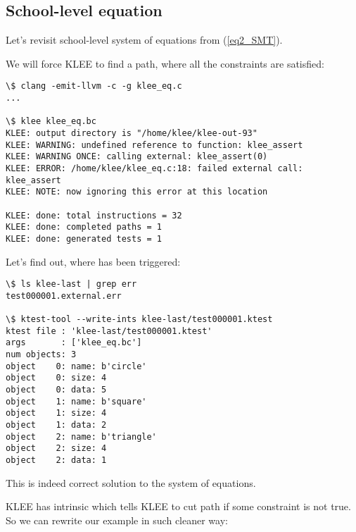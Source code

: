 \subsection{School-level equation}

Let's revisit school-level system of equations from (\ref{eq2_SMT}).

We will force KLEE to find a path, where all the constraints are satisfied:



\begin{lstlisting}
\$ clang -emit-llvm -c -g klee_eq.c
...

\$ klee klee_eq.bc
KLEE: output directory is "/home/klee/klee-out-93"
KLEE: WARNING: undefined reference to function: klee_assert
KLEE: WARNING ONCE: calling external: klee_assert(0)
KLEE: ERROR: /home/klee/klee_eq.c:18: failed external call: klee_assert
KLEE: NOTE: now ignoring this error at this location

KLEE: done: total instructions = 32
KLEE: done: completed paths = 1
KLEE: done: generated tests = 1
\end{lstlisting}

Let's find out, where  has been triggered:

\begin{lstlisting}
\$ ls klee-last | grep err
test000001.external.err

\$ ktest-tool --write-ints klee-last/test000001.ktest
ktest file : 'klee-last/test000001.ktest'
args       : ['klee_eq.bc']
num objects: 3
object    0: name: b'circle'
object    0: size: 4
object    0: data: 5
object    1: name: b'square'
object    1: size: 4
object    1: data: 2
object    2: name: b'triangle'
object    2: size: 4
object    2: data: 1
\end{lstlisting}

This is indeed correct solution to the system of equations.

KLEE has intrinsic  which tells KLEE to cut path if some constraint is not true.
So we can rewrite our example in such cleaner way:




